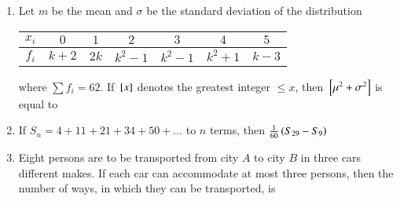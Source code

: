 \documentclass[journal]{IEEEtran}
\numberwithin{equation}{enumi}
\numberwithin{figure}{enumi}
\begin{document}
\begin{enumerate}
    \item  
    Let $m$ be the mean and $\sigma$ be the standard deviation of the distribution
    \begin{table}[H]
        \centering
        \begin{tabular}{|c |c |c |c |c |c |c |}
        
        \hline
             $x_i$ & $0$ & $1$ & $2$ & $3$ & $4$ & $5$ \\
        \hline
             $f_i$ & $k + 2$ & $2k$ & $k^2 - 1$ & $k^2 -1$ & $k^2 +1$ & $k - 3$ \\
        \hline
        \end{tabular}
    \end{table}
    where $\sum f_i = 62$. If ${}\left[x\right]$ denotes the greatest integer $\leq x $, then ${}\left[\mu^2 + \sigma^2\right]$ is equal to

    \hfill{}

    \begin{enumerate}
    \end{enumerate}

    \item 
    If $S_n = 4 + 11 + 21 + 34 + 50 + \dots$ to $n$ terms, then $\frac{1}{60}\left(S_{29} - S_9\right)$ 
    
    \hfill{}

    \begin{enumerate}
    \end{enumerate}

    \item 
    Eight persons are to be transported from city $A$ to city $B$ in three cars different makes. If each car can accommodate at most three persons, then the number of ways, in which they can be transported, is


\end{enumerate}
\end{document}
